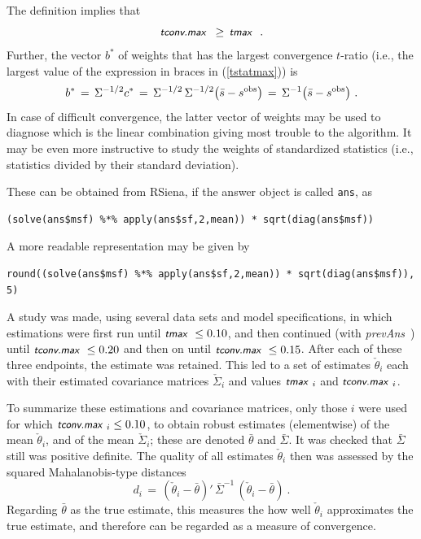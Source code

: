 \documentclass[a4paper,12pt,fleqn]{article}
\newcommand{\nnm}[1]{\textsf{\small\textit{#1}\ }}
\begin{document}
The definition implies that
\[
    \nnm{tconv.max} \, \geq \, \nnm{tmax}   \ .
\]
Further, the vector $b^*$ of weights that has the largest convergence $t$-ratio
(i.e., the largest value of the expression in braces in (\ref{tstatmax})) is
\begin{equation}
  b^* \,=\, \Sigma^{-1/2}c^* \,=\, \Sigma^{-1/2} \, \Sigma^{-1/2}  \big(\bar{s} - s^{\rm{obs}}\big)
  \,=\, \Sigma^{-1}  \big(\bar{s} - s^{\rm{obs}}\big) \ .
\end{equation}
In case of difficult convergence, the latter vector of weights may be used
to diagnose which is the linear combination giving most trouble
to the algorithm.
It may be even more instructive to study the weights of standardized statistics
(i.e., statistics divided by their standard deviation).

These can be obtained from RSiena, if the answer object is called \texttt{ans}, as
\begin{verbatim}
(solve(ans$msf) %*% apply(ans$sf,2,mean)) * sqrt(diag(ans$msf))
\end{verbatim}
A more readable representation may be given by
\begin{verbatim}
round((solve(ans$msf) %*% apply(ans$sf,2,mean)) * sqrt(diag(ans$msf)), 5)
\end{verbatim}


A study was made, using several data sets and model specifications,
in which estimations were first run until $ \nnm{tmax} \leq 0.10$,
and then continued (with \nnm{prevAns}) until $ \nnm{tconv.max} \leq 0.20$
and then on until $ \nnm{tconv.max} \leq 0.15$.
After each of these three endpoints, the estimate was retained.
This led to a set of estimates $\check{\theta}_i$ each with their estimated
covariance matrices $\check{\Sigma}_i$ and values $\nnm{tmax}_i$
and $\nnm{tconv.max}_i$.

To summarize these estimations and covariance matrices, only those
$i$ were used for which $\nnm{tconv.max}_i \leq 0.10$,
to obtain robust estimates
(elementwise) of the mean $\check{\theta}_i$, and of the mean
$\check{\Sigma}_i$; these are denoted $\bar\theta$
and $\bar\Sigma$. It was checked that $\bar\Sigma$ still was positive
definite.
The quality of all estimates $\check\theta_i$ then was assessed by the
squared Mahalanobis-type distances
\[
    d_i \,=\, (\check\theta_i - \bar\theta)' \, {\bar\Sigma}^{-1} \,
                (\check\theta_i - \bar\theta) \ .
\]
Regarding $\bar\theta$ as the true estimate, this measures the
how well $\check\theta_i$ approximates the true estimate, and therefore
can be regarded as a measure of convergence.
\end{document}
